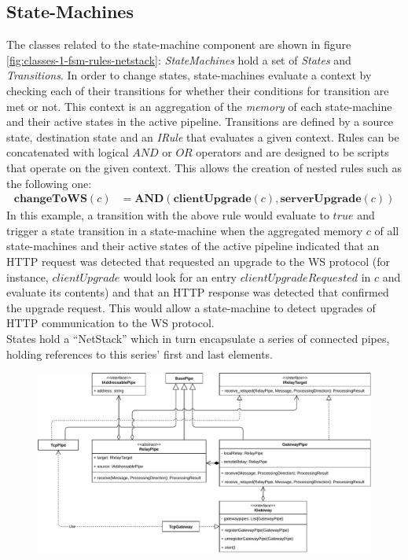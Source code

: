 \subsection{State-Machines} The classes related to the state-machine component are shown in figure \ref{fig:classes-1-fsm-rules-netstack}: \emph{StateMachines} hold a set of \emph{States} and \emph{Transitions}. In order to change states, state-machines evaluate a context by checking each of their transitions for whether their conditions for transition are met or not. This context is an aggregation of the \emph{memory} of each state-machine and their active states in the active pipeline. Transitions are defined by a source state, destination state and an \emph{IRule} that evaluates a given context. Rules can be concatenated with logical $AND$ or $OR$ operators and are designed to be scripts that operate on the given context. This allows the creation of nested rules such as the following one:
\begin{align*}
    \mathbf{changeToWS}(c) & = \mathbf{AND}(\mathbf{clientUpgrade}(c), \mathbf{serverUpgrade}(c))
\end{align*}
In this example, a transition with the above rule would evaluate to $true$ and trigger a state transition in a state-machine when the aggregated memory $c$ of all state-machines and their active states of the active pipeline indicated that an \ac{HTTP} request was detected that requested an upgrade to the \ac{WS} protocol (for instance, $clientUpgrade$ would look for an entry $clientUpgradeRequested$ in $c$ and evaluate its contents) and that an \ac{HTTP} response was detected that confirmed the upgrade request. This would allow a state-machine to detect upgrades of \ac{HTTP} communication to the \ac{WS} protocol.\\
States hold a \enquote{NetStack} which in turn encapsulate a series of connected pipes, holding references to this series' first and last elements.
\begin{figure}[h]
    \centering
    \includegraphics[width=14cm]{img/ch05/classes-3-gateway.pdf}
    \label{fig:classes-3-gateway}
\end{figure}

